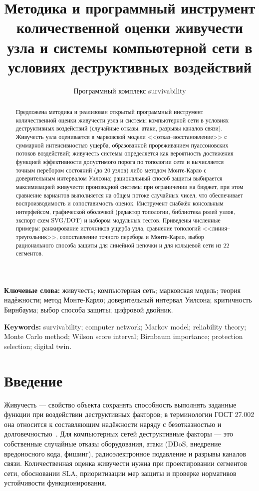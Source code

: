 \documentclass[12pt]{article}
\title{Методика и программный инструмент количественной оценки живучести\\
узла и системы компьютерной сети в условиях деструктивных воздействий}
\author{Программный комплекс survivability}
\date{}
\begin{document}
\maketitle

\begin{abstract}
Предложена методика и реализован открытый программный инструмент
количественной оценки живучести узла и системы компьютерной сети в условиях
деструктивных воздействий (случайные отказы, атаки, разрывы каналов связи).
Живучесть узла оценивается в марковской модели <<отказ--восстановление>> с
суммарной интенсивностью ущерба, образованной прореживанием пуассоновских
потоков воздействий; живучесть системы определяется как вероятность
достижения функцией эффективности допустимого порога по топологии сети и
вычисляется точным перебором состояний (до 20 узлов) либо методом
Монте-Карло с доверительным интервалом Уилсона; рациональный способ защиты
выбирается максимизацией живучести производной системы при ограничении на
бюджет, при этом сравнение вариантов выполняется на общем потоке случайных
чисел, что обеспечивает воспроизводимость и сопоставимость оценок.
Инструмент снабжён консольным интерфейсом, графической оболочкой
(редактор топологии, библиотека ролей узлов, экспорт схем SVG/DOT) и
набором модульных тестов. Приведены численные примеры: ранжирование
источников ущерба узла, сравнение топологий <<линия--треугольник>>,
сопоставление точного перебора и Монте-Карло, выбор рационального способа
защиты для линейной цепочки и для кольцевой сети из 22 сегментов.
\end{abstract}

\noindent\textbf{Ключевые слова:} живучесть; компьютерная сеть; марковская
модель; теория надёжности; метод Монте-Карло; доверительный интервал Уилсона;
критичность Бирнбаума; выбор способа защиты; цифровой двойник.

\medskip
\noindent\textbf{Keywords:} survivability; computer network; Markov model;
reliability theory; Monte Carlo method; Wilson score interval; Birnbaum
importance; protection selection; digital twin.

\section{Введение}

Живучесть --- свойство объекта сохранять способность выполнять заданные
функции при воздействии деструктивных факторов; в терминологии ГОСТ 27.002
она относится к составляющим надёжности наряду с безотказностью и
долговечностью~\cite{gost}. Для компьютерных сетей деструктивные факторы ---
это собственные случайные отказы оборудования, атаки (DDoS, внедрение
вредоносного кода, фишинг), радиоэлектронное подавление и разрывы каналов
связи. Количественная оценка живучести нужна при проектировании сегментов
сети, обосновании SLA, приоритизации мер защиты и проверке нормативов
устойчивости функционирования.
\end{document}
